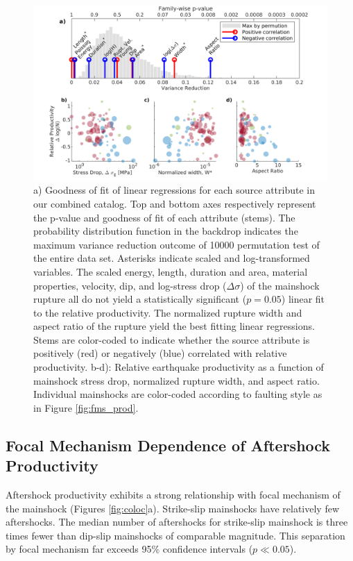\documentclass[draft, jgrga]{agujournal2018}
\begin{document}
    \begin{figure}
        \centering
        \includegraphics[width = \linewidth]{figures/stem_plot.png}
        \caption{a) Goodness of fit of linear regressions for each source attribute in our combined catalog. Top and bottom axes respectively represent the p-value and goodness of fit of each attribute (stems). The probability distribution function in the backdrop indicates the maximum variance reduction outcome of 10000 permutation test of the entire data set. Asterisks indicate scaled and log-transformed variables. The scaled energy, length, duration and area, material properties, velocity, dip, and log-stress drop ($\Delta\sigma$) of the mainshock rupture all do not yield a statistically significant ($p=0.05$) linear fit to the relative productivity. The normalized rupture width and aspect ratio of the rupture yield the best fitting linear regressions. Stems are color-coded to indicate whether the source attribute is positively (red) or negatively (blue) correlated with relative productivity. b-d): Relative earthquake productivity as a function of mainshock stress drop, normalized rupture width, and aspect ratio. Individual mainshocks are color-coded according to faulting style as in Figure \ref{fig:fms_prod}.}
        \label{fig:r2_finite_fault}
    \end{figure}
    
    \subsection{Focal Mechanism Dependence of Aftershock Productivity} 
    
    Aftershock productivity exhibits a strong relationship with focal mechanism of the mainshock (Figures \ref{fig:coloc}a). Strike-slip mainshocks have relatively few aftershocks. The median number of aftershocks for strike-slip mainshock is three times fewer than dip-slip mainshocks of comparable magnitude. This separation by focal mechanism far exceeds 95\% confidence intervals ($p\ll 0.05$). 
    
\end{document}

